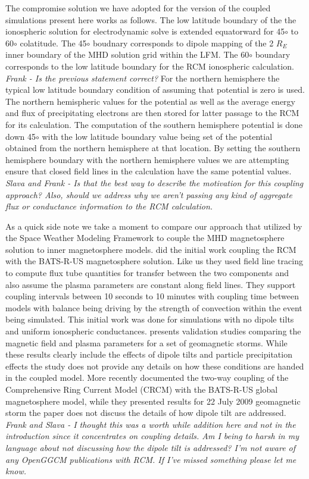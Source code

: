 \documentclass[draft,jgrga]{agutex}
\begin{document}
\begin{article}
The compromise solution we have adopted for the version of the coupled simulations present here works as follows.  The low latitude boundary of the the ionospheric solution for electrodynamic solve is extended equatorward for 45$\circ$ to 60$\circ$ colatitude.   The 45$\circ$ boudnary corresponds to dipole mapping of the 2 $R_E$ inner boundary of the MHD solution grid within the LFM.  The 60$\circ$ boundary corresponds to the low latitude boundary for the RCM ionospheric calculation. {\em Frank - Is the previous statement correct?} For the northern hemisphere the typical low latitude boundary condition of assuming that potential is zero is used.  The northern hemispheric values for the potential as well as the average energy and flux of precipitating electrons are then stored for latter passage to the RCM for its calculation.  The computation of the southern hemisphere potential is done down 45$\circ$ with the low latitude boundary value being set of the potential obtained from the northern hemisphere at that location.   By setting the southern hemisphere boundary with the northern hemisphere values we are attempting ensure that closed field lines in the calculation have the same potential values.   {\em Slava and Frank - Is that the best way to describe the motivation for this coupling approach?  Also, should we address why we aren't passing any kind of aggregate flux or conductance information to the RCM calculation.}

As a quick side note we take a moment to compare our approach that utilized by the Space Weather Modeling Framework \cite{2005JGRA..11012226T} to couple the MHD magnetosphere solution to inner magnetosphere models.   \cite{2004JGRA..10912219D} did the initial work coupling the RCM with the BATS-R-US magnetosphere solution.  Like us they used field line tracing to compute flux tube quantities for transfer between the two components and also assume the plasma parameters are constant along field lines.  They support coupling intervals between 10 seconds to 10 minutes with coupling time between models with balance being driving by the strength of  convection within the event being simulated.  This initial work was done for simulations with no dipole tilts and uniform ionospheric conductances.   \cite{2010SpWea...803002W} presents validation studies comparing the magnetic field and plasma parameters for a set of geomagnetic storms.  While these results clearly include the effects of dipole tilts and particle precipitation effects the study does not provide any details on how these conditions are handed in the coupled model.   More recently \cite{Glocer:2013dv} documented the two-way coupling of the Comprehensive Ring Current Model (CRCM) with the BATS-R-US global magnetosphere model, while they presented results for 22 July 2009 geomagnetic storm the paper does not discuss the details of how dipole tilt are addressed.  {\em Frank and Slava - I thought this was a worth while addition here and not in the introduction since it concentrates on coupling details.  Am I being to harsh in my language about not discussing how the dipole tilt is addressed? I'm not aware of any OpenGGCM publications with RCM.  If I've missed something please let me know.}


\end{article}
\end{document}
